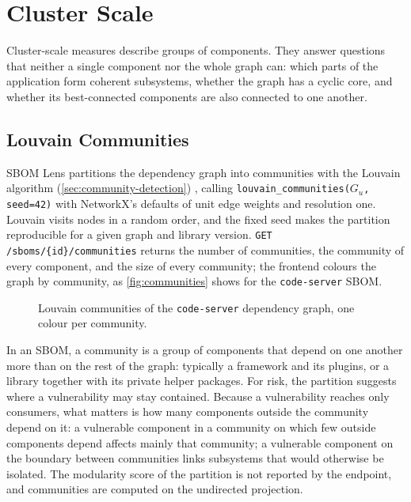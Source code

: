 \section{Cluster Scale}
\label{sec:cluster-scale}

Cluster-scale measures describe groups of components. They answer questions that neither a single component nor the whole graph can: which parts of the application form coherent subsystems, whether the graph has a cyclic core, and whether its best-connected components are also connected to one another.


\subsection{Louvain Communities}
\label{sec:ns-communities}

SBOM Lens partitions the dependency graph into communities with the Louvain algorithm (\autoref{sec:community-detection}) \citep{Blondel2008}, calling \texttt{louvain\_communities(}\(G_u\)\texttt{, seed=42)} with NetworkX's defaults of unit edge weights and resolution one. Louvain visits nodes in a random order, and the fixed seed makes the partition reproducible for a given graph and library version. \texttt{GET /sboms/\{id\}/communities} returns the number of communities, the community of every component, and the size of every community; the frontend colours the graph by community, as \autoref{fig:communities} shows for the \texttt{code-server} SBOM.

\begin{figure}[!htpb]
    \centering
    \caption[Louvain communities]{Louvain communities of the \texttt{code-server} dependency graph, one colour per community.}
    \label{fig:communities}
\end{figure}

In an SBOM, a community is a group of components that depend on one another more than on the rest of the graph: typically a framework and its plugins, or a library together with its private helper packages. For risk, the partition suggests where a vulnerability may stay contained. Because a vulnerability reaches only consumers, what matters is how many components outside the community depend on it: a vulnerable component in a community on which few outside components depend affects mainly that community; a vulnerable component on the boundary between communities links subsystems that would otherwise be isolated. The modularity score of the partition is not reported by the endpoint, and communities are computed on the undirected projection.



